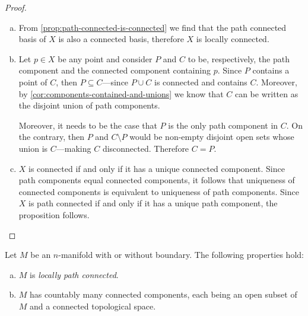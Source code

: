 \begin{proof}
    \begin{enumerate}[(a)]\setlength\itemsep{0em}
        \item From \cref{prop:path-connected-is-connected} we find that the path
              connected basis of \(X\) is also a connected basis, therefore \(X\) is locally connected.

        \item Let \(p \in X\) be any point and consider \(P\) and \(C\) to be,
              respectively, the path component and the connected component containing
              \(p\). Since \(P\) contains a point of \(C\), then \(P \subseteq C\)---since
              \(P \cup C\) is connected and contains \(C\). Moreover, by
              \cref{cor:components-contained-and-unions} we know that \(C\) can be written
              as the disjoint union of path components.

              Moreover, it needs to be the case that \(P\) is the only path component in
              \(C\). On the contrary, then \(P\) and \(C \setminus P\) would be non-empty
              disjoint open sets whose union is \(C\)---making \(C\)
              disconnected. Therefore \(C = P\).

        \item \(X\) is connected if and only if it has a unique connected
              component. Since path components equal connected components, it follows that
              uniqueness of connected components is equivalent to uniqueness of path
              components. Since \(X\) is path connected if and only if it has a unique path
              component, the proposition follows.
    \end{enumerate}
\end{proof}

\begin{proposition}
    \label{prop:connectivity-manifolds}
    Let \(M\) be an \(n\)-manifold with or without boundary. The following
    properties hold:
    \begin{enumerate}[(a)]\setlength\itemsep{0em}
        \item \(M\) is \emph{locally path connected}.

        \item \(M\) has countably many connected components, each being an open subset
              of \(M\) and a connected topological space.
    \end{enumerate}
\end{proposition}

